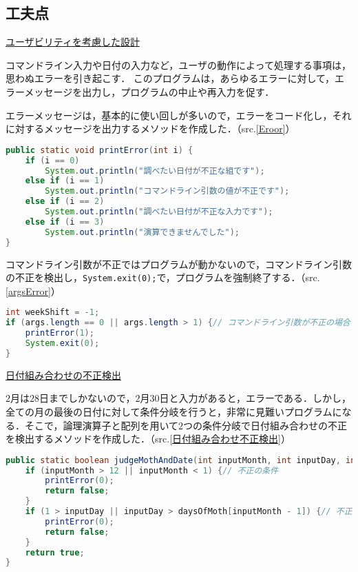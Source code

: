 \documentclass[a4j,11pt]{jsarticle}
\begin{document}
\subsection{工夫点}\label{不正検出}
\noindent\underline{ユーザビリティを考慮した設計}\par
コマンドライン入力や日付の入力など，ユーザの動作によって処理する事項は，思わぬエラーを引き起こす．
このプログラムは，あらゆるエラーに対して，エラーメッセージを出力し，プログラムの中止や再入力を促す．\par
エラーメッセージは，基本的に使い回しが多いので，エラーをコード化し，それに対するメッセージを出力するメソッドを作成した．（src.\ref{Eroor}）\par
\begin{lstlisting}[caption=エラーメッセージ・メソッド, label=Eroor, language=Java]
public static void printError(int i) {
    if (i == 0)
        System.out.println("調べたい日付が不正な組です");
    else if (i == 1)
        System.out.println("コマンドライン引数の値が不正です");
    else if (i == 2)
        System.out.println("調べたい日付が不正な入力です");
    else if (i == 3)
        System.out.println("演算できませんでした");
}
\end{lstlisting}
コマンドライン引数が不正ではプログラムが動かないので，コマンドライン引数の不正を検出し，\verb|System.exit(0);|で，プログラムを強制終了する．（src.\ref{argsError}）
\begin{lstlisting}[caption=コマンドライン引数の不正検出, label=argsError, language=Java]
int weekShift = -1;
if (args.length == 0 || args.length > 1) {// コマンドライン引数が不正の場合（入力なし，または，2つ以上の入力）にエラーを出し，終了
    printError(1);
    System.exit(0);
}

\end{lstlisting}
\newpage
\noindent\underline{日付組み合わせの不正検出}\par
$2$月は$28$日までしかないので，$2$月$30$日と入力があると，エラーである．しかし，全ての月の最後の日付に対して条件分岐を行うと，非常に見難いプログラムになる．そこで，論理演算子と配列を用いて$2$つの条件分岐で日付組み合わせの不正を検出するメソッドを作成した．（src.\ref{日付組み合わせ不正検出}）
\begin{lstlisting}[caption=日付組み合わせ不正検出, label=日付組み合わせ不正検出, language=Java]
public static boolean judgeMothAndDate(int inputMonth, int inputDay, int[] daysOfMoth) {// 月日の組み合わせの判定（不正であればFalse）
    if (inputMonth > 12 || inputMonth < 1) {// 不正の条件
        printError(0);
        return false;
    }
    if (1 > inputDay || inputDay > daysOfMoth[inputMonth - 1]) {// 不正の条件
        printError(0);
        return false;
    }
    return true;
}
\end{lstlisting}
\end{document}
